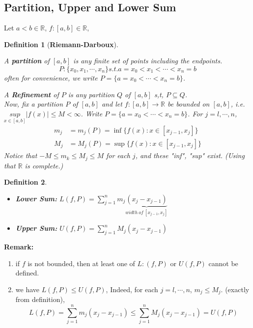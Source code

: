 \documentclass[12pt]{article}
\theoremstyle{plain}
\newtheorem{definition}{Definition}[subsection]
\newcommand{\abs}[1]{\left| #1 \right|}
\begin{document}
	\vspace{0.3 in}



	\subsection{Partition, Upper and Lower Sum}
	Let $a<b \in \mathbb{R}$, $f:[a,b]\in\mathbb{R}$,

	\begin{definition}[\textbf{Riemann-Darboux}]
		$ $
		
		A \textbf{partition} of $[a,b]$ is any finite set of points including
		the endpoints. 
		\[
			P:\{x_0,x_1,\cdots, x_n\} s.t. a=x_0<x_1<\cdots<x_n=b
		\]
		often for convenience, we write $P=\{a=x_0<\cdots<x_n=b\}$.
	
		A \textbf{Refinement} of $P$ is any partition $Q$ of $[a,b]$ s,t,
		$P\subseteq Q$.\\
	
		Now, fix a partition $P$ of $[a,b]$ and let $f:[a,b]\to \mathbb{R}$ be 
		bounded on $[a,b]$, i.e. $\underset{x\in [a,b]}{sup} 
		\abs{f(x)}\leq M<\infty$.	
		Write $P=\{a=x_0<\cdots<x_n=b\}$. For $j = l, \cdots, n$, 
		\begin{align*}
			m_j &= m_j(P) = \inf \{f(x) : x\in [x_{j-1},x_j]\}\\
			M_j &= M_j(P) = \sup \{f(x) : x\in [x_{j-1},x_j]\}
		\end{align*}
	Notice that $-M\leq m_k\leq M_j\leq M$ for each $j$, and these "inf", "sup"
	exist. (Using that $\mathbb{R}$ is complete.)\\
	\end{definition}

	\begin{definition}
		$ $
		\begin{itemize}
			\item \textbf{Lower Sum:}
				$L(f, P) = \sum_{j=1}^n m_j 
				\underbrace{(x_j-x_{j-1})}_{width\ of\ [x_{j-1},x_j]}$
			\item \textbf{Upper Sum:} 
				$U(f, P) = \sum_{j=1}^n M_j (x_j-x_{j-1})$\\

		\end{itemize}
	\end{definition}

	{\color{brown}
	\textbf{Remark: }
	\begin{enumerate}
		\item if $f$ is not bounded, then at least one of $L:(f,P)$ or $U(f, P)$ 
			cannot be defined. 
			
		\item we have $L(f, P)\leq U(f,P)$, Indeed, for each $j=l,\cdots, n$,
			$m_j\leq M_j$. (exactly from definition), 
			\[
				L(f, P) = \sum_{j=1}^n m_j (x_j-x_{j-1})\leq
				\sum_{j=1}^n M_j (x_j-x_{j-1}) = U(f, P)
			\]
	\end{enumerate}}
\end{document}
